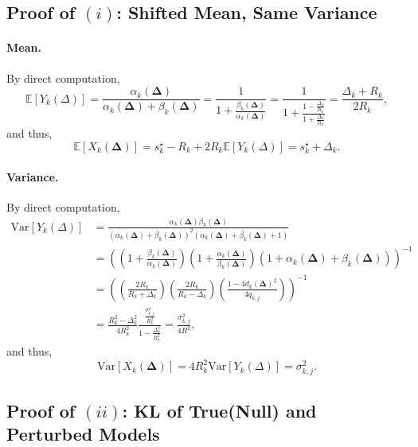 \documentclass{article}
\newcommand{\E}{\mathbb{E}}
\newcommand{\Var}{\mathrm{Var}}
\theoremstyle{plain}
\theoremstyle{definition}
\theoremstyle{plain}
\begin{document}
\subsection{\texorpdfstring{Proof of $(i)$: Shifted Mean, Same Variance}{Proof of (i): Shifted Mean, Same Variance}}

\paragraph{Mean.}
By direct computation,
\begin{equation}
    \E[Y_k(\Delta)] = \frac{\alpha_k(\bm\Delta)}{\alpha_k(\bm\Delta) + \beta_k(\bm\Delta)}
    = \frac{1}{1 + \frac{\beta_k(\bm\Delta)}{\alpha_k(\bm\Delta)}}
    = \frac{1}{1 + \frac{1 - \frac{\Delta_k}{R_k}}{1 + \frac{\Delta_k}{R_k}}}
    = \frac{\Delta_k + R_k}{2 R_k},
\end{equation}
and thus,
\begin{equation}
    \E[X_k(\bm\Delta)] = s_k^\star - R_k + 2 R_k \E[Y_k(\Delta)] = s_k^\star + \Delta_k.
\end{equation}

\paragraph{Variance.}
By direct computation,
\begin{align}
    \Var[Y_k(\Delta)] &= \frac{\alpha_k(\bm\Delta) \beta_k(\bm\Delta)}{(\alpha_k(\bm\Delta) + \beta_k(\bm\Delta))^2 (\alpha_k(\bm\Delta) + \beta_k(\bm\Delta) + 1)} \\
    &= \left( \left( 1 + \frac{\beta_k(\bm\Delta)}{\alpha_k(\bm\Delta)} \right) \left( 1 + \frac{\alpha_k(\bm\Delta)}{\beta_k(\bm\Delta)} \right) \left( 1 + \alpha_k(\bm\Delta) + \beta_k(\bm\Delta) \right) \right)^{-1} \\
    &= \left( \left( \frac{2 R_k}{R_k + \Delta_k} \right) \left( \frac{2 R_k}{R_k - \Delta_k} \right) \left( \frac{1 - 4 d_k(\bm\Delta)^2}{4 q_{k,j}} \right) \right)^{-1} \\
    &= \frac{R_k^2 - \Delta_k^2}{4 R_k^2} \frac{\frac{\sigma_{k,j}^2}{R_k^2}}{1 - \frac{\Delta_k^2}{R_k^2}} = \frac{\sigma_{k,j}^2}{4 R^2},
\end{align}
and thus,
\begin{equation}
    \Var[X_k(\bm\Delta)] = 4 R_k^2 \Var[Y_k(\Delta)] = \sigma_{k,j}^2.
\end{equation}



\subsection{\texorpdfstring{Proof of $(ii)$: KL of True(Null) and Perturbed Models}{Proof of (ii): KL of True(Null) and Perturbed Models}}
\end{document}
